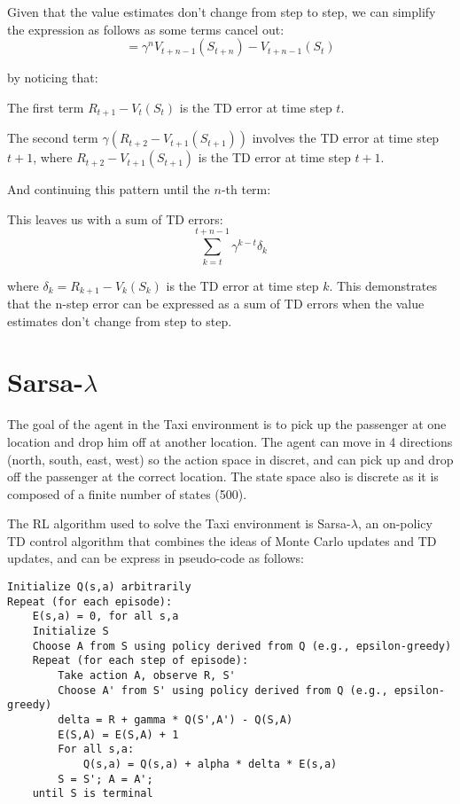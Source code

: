 \documentclass{article}
\begin{document}
Given that the value estimates don't change from step to step, we can simplify the expression as follows as some terms cancel out:
\[ = \gamma^n V_{t+n-1}(S_{t+n}) - V_{t+n-1}(S_t) \]

by noticing that:

The first term \(R_{t+1} - V_{t}(S_t)\) is the TD error at time step \(t\).

The second term \(\gamma(R_{t+2} - V_{t+1}(S_{t+1}))\)
 involves the TD error at time step \(t+1\),
  where \(R_{t+2} - V_{t+1}(S_{t+1})\) is the TD error at time step \(t+1\).

And continuing this pattern until the \(n\)-th term:

This leaves us with a sum of TD errors:
\[ \sum_{k=t}^{t+n-1} \gamma^{k-t} \delta_k \]

where \( \delta_k = R_{k+1} - V_k(S_k) \) is the TD error at time step \(k\). This demonstrates that the n-step error can be expressed as a sum of TD errors when the value estimates don't change from step to step.


\section{Sarsa-$\lambda$}


The goal of the agent in the Taxi environment is to pick up the passenger at one location and drop him off at another location.
The agent can move in 4 directions (north, south, east, west) so the action space in discret,
and can pick up and drop off the passenger at the correct location.
The state space also is discrete 
as it is composed of a finite number of states (500).

The RL algorithm used to solve the Taxi environment is Sarsa-$\lambda$,
an on-policy TD control algorithm that combines the ideas of Monte Carlo updates and TD updates,
and can be express in pseudo-code as follows:

\begin{verbatim}
Initialize Q(s,a) arbitrarily
Repeat (for each episode):
    E(s,a) = 0, for all s,a
    Initialize S
    Choose A from S using policy derived from Q (e.g., epsilon-greedy)
    Repeat (for each step of episode):
        Take action A, observe R, S'
        Choose A' from S' using policy derived from Q (e.g., epsilon-greedy)
        delta = R + gamma * Q(S',A') - Q(S,A)
        E(S,A) = E(S,A) + 1
        For all s,a:
            Q(s,a) = Q(s,a) + alpha * delta * E(s,a)
        S = S'; A = A';
    until S is terminal
\end{verbatim}
\end{document}
